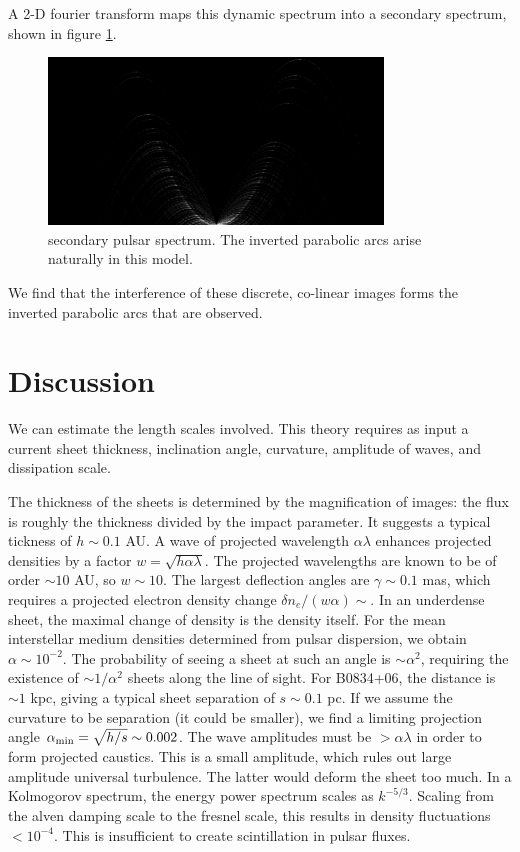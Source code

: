 \documentclass[useAMS,usenatbib]{mn2e}
\begin{document}
A 2-D fourier transform maps this dynamic spectrum into a secondary
spectrum, shown in figure \ref{fig:ss}.

\begin{figure}
\centerline{\includegraphics[width=3.5in]{sspect.jpg}}
\caption{secondary pulsar spectrum.  The inverted parabolic arcs arise
naturally in this model.}
\label{fig:ss}
\end{figure}

We find that the interference of these discrete, co-linear images
forms the inverted parabolic arcs that are observed.

\section{Discussion}

We can estimate the length scales involved.  This theory requires as
input a current sheet thickness, inclination angle, curvature,
amplitude of waves, and dissipation scale.

The thickness of the sheets is determined by the magnification of
images: the flux is roughly the thickness divided by the impact
parameter.  It suggests a typical tickness of $h\sim 0.1$ AU.  A wave
of projected wavelength $\alpha \lambda$ enhances projected densities
by a factor $w=\sqrt{h \alpha \lambda}$.  The projected wavelengths
are known to be of order $\sim 10$ AU, so $w \sim 10$.  The largest
deflection angles are $\gamma \sim 0.1$ mas, which requires a
projected electron density change $\delta n_e/(w\alpha) \sim$.  In an
underdense sheet, the maximal change of density is the density itself.
For the mean interstellar medium densities determined from pulsar
dispersion, we obtain $\alpha \sim 10^{-2}$.  The probability of
seeing a sheet at such an angle is $\sim \alpha^2$, requiring the
existence of $\sim 1/\alpha^2$ sheets along the line of sight.  For
B0834+06, the distance is $\sim 1$ kpc, giving a typical sheet
separation of $s \sim 0.1$ pc.  If we assume the curvature to be
separation (it could be smaller), we find a limiting projection angle
$\alpha_{\rm min} = \sqrt{h/s} \sim 0.002$.  The wave amplitudes must
be $> \alpha \lambda$ in order to form projected caustics.  This is a
small amplitude, which rules out large amplitude universal turbulence.
The latter would deform the sheet too much.  In a Kolmogorov spectrum,
the energy power spectrum scales as $k^{-5/3}$.  Scaling from the
alven damping scale to the fresnel scale, this results in density
fluctuations $< 10^{-4}$.  This is insufficient to create
scintillation in pulsar fluxes.
\end{document}
